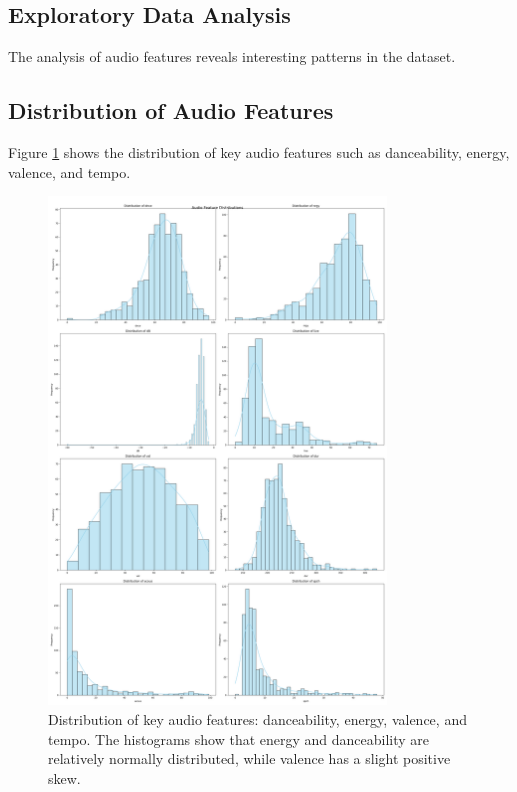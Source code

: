 \documentclass[runningheads]{llncs}
\begin{document}
\subsection{Exploratory Data Analysis}

The analysis of audio features reveals interesting patterns in the dataset.

\subsection{Distribution of Audio Features}

Figure \ref{fig:audio_features} shows the distribution of key audio features such as danceability, energy, valence, and tempo.

\begin{figure}[h]
    \centering
    \includegraphics[width=0.8\textwidth]{audio_feature_distribution.png}
    \caption{Distribution of key audio features: danceability, energy, valence, and tempo. The histograms show that energy and danceability are relatively normally distributed, while valence has a slight positive skew.}
    \label{fig:audio_features}
\end{figure}
\end{document}
